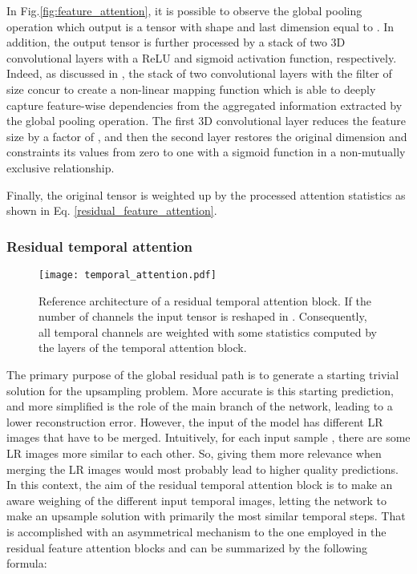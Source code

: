 \documentclass[journal]{IEEEtran}
\begin{document}
In Fig.\ref{fig:feature_attention}, it is possible to observe the global pooling operation which output is a tensor  with shape  and last dimension equal to . In addition, the output tensor  is further processed by a stack of two 3D convolutional layers with a ReLU \cite{nair2010rectified} and sigmoid activation function, respectively. Indeed, as discussed in \cite{hu2018squeeze}, the stack of two convolutional layers with the filter of size  concur to create a non-linear mapping function which is able to deeply capture feature-wise dependencies from the aggregated information extracted by the global pooling operation. The first 3D convolutional layer reduces the feature size by a factor of , and then the second layer restores the original dimension and constraints its values from zero to one with a sigmoid function in a non-mutually exclusive relationship.

Finally, the original tensor  is weighted up by the processed attention statistics as shown in Eq. \ref{residual_feature_attention}.
\subsubsection{Residual temporal attention}
\begin{figure}[b]
\texttt{[image: temporal\_attention.pdf]}
\caption{Reference architecture of a residual temporal attention block. If the number of channels  the input tensor  is reshaped in . Consequently, all temporal channels are weighted with some statistics computed by the layers of the temporal attention block.}
\label{fig:temporal_attention}
\end{figure}
The primary purpose of the global residual path is to generate a starting trivial solution for the upsampling problem. More accurate is this starting prediction, and more simplified is the role of the main branch of the network, leading to a lower reconstruction error. However, the input of the model  has  different LR images that have to be merged. Intuitively, for each input sample , there are some LR images more similar to each other. So, giving them more relevance when merging the  LR images would most probably lead to higher quality predictions. In this context, the aim of the residual temporal attention block is to make an aware weighing of the different input temporal images, letting the network to make an upsample solution with primarily the most similar temporal steps.
That is accomplished with an asymmetrical mechanism to the one employed in the residual feature attention blocks and can be summarized by the following formula:
\end{document}
